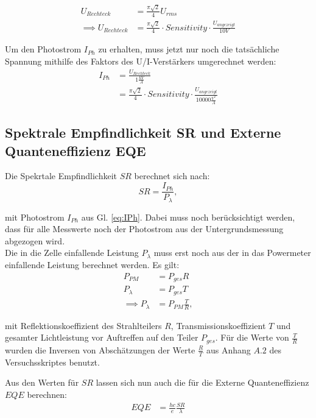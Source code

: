 \begin{align}
U_{Rechteck} &= \frac{\pi \sqrt{2}}{4} U_{rms} \\
\implies U_{Rechteck} &= \frac{\pi \sqrt{2}}{4} \cdot Sensitivity \cdot \frac{U_{angezeigt}}{10V}
\end{align}

Um den Photostrom $I_{Ph}$ zu erhalten, muss jetzt nur noch die tatsächliche Spannung mithilfe des Faktors des U/I-Verstärkers umgerechnet werden:\\

\begin{align}
I_{Ph} &= \frac{U_{Rechteck}}{1 \frac{kV}{A}} \nonumber \\
 &= \frac{\pi \sqrt{2}}{4} \cdot Sensitivity \cdot \frac{U_{angezeigt}}{10000 \frac{V^2}{A}}
\label{eq:IPh}
\end{align}


\subsection{Spektrale Empfindlichkeit SR und Externe Quanteneffizienz EQE}

Die Spekrtale Empfindlichkeit $SR$ berechnet sich nach:
\begin{equation}
SR = \frac{I_{Ph}}{P_\lambda},
\end{equation}

mit Photostrom $I_{Ph}$ aus Gl. \ref{eq:IPh}. Dabei muss noch berücksichtigt werden, dass für alle Messwerte noch der Photostrom aus der
Untergrundsmessung abgezogen wird. \\
Die in die Zelle einfallende Leistung $P_{\lambda}$ muss erst noch aus der in das Powermeter einfallende Leistung berechnet werden. Es gilt:
\begin{align}
P_{PM} &= P_{ges} R \nonumber \\
P_{\lambda} &= P_{ges} T \nonumber \\
\implies P_{\lambda} &= P_{PM} \frac{T}{R},
\end{align}

mit Reflektionskoeffizient des Strahlteilers $R$, Transmissionskoeffizient $T$ und gesamter Lichtleistung vor Auftreffen auf den Teiler $P_{ges}$.
Für die Werte von $\frac{T}{R}$ wurden die Inversen von Abschätzungen der Werte $\frac{R}{T}$ aus Anhang $A.2$ des Versuchsskriptes benutzt.

Aus den Werten für $SR$ lassen sich nun auch die für die Externe Quanteneffizienz $EQE$ berechnen:
\begin{align}
EQE &= \frac{hc}{e} \frac{SR}{\lambda}
\label{eq:eqe}
\end{align}

